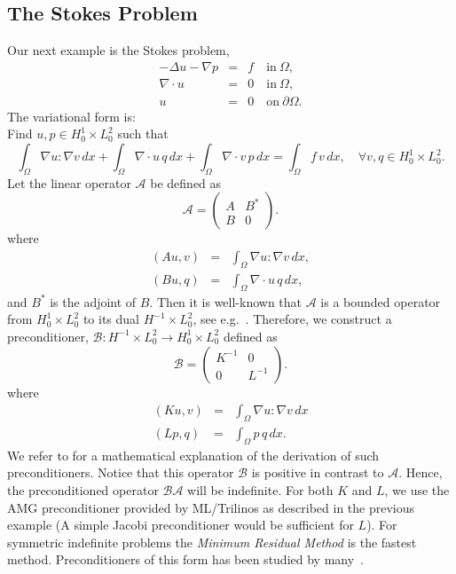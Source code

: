 \subsection{The Stokes Problem}
Our next example is the Stokes problem, 
\begin{eqnarray}
-\Delta u - \nabla p &=& f \quad \mbox{in} \ \Omega, \\ 
\nabla \cdot u &=& 0 \quad \mbox{in} \  \Omega, \\
             u &=& 0   \quad \mbox{on} \  \partial \Omega.  
\end{eqnarray}
The variational form is: \\ 
Find $u,p \in H^1_0 \times L_0^2$ such that  
\[
\int_\Omega \nabla u : \nabla v \,  dx + 
\int_\Omega \nabla \cdot u \, q \,  dx +  
\int_\Omega \nabla \cdot v \, p \,  dx = \int_\Omega f\, v\, dx   , \quad \forall v,q \in H^1_0 \times L_0^2.
\]
Let the linear operator $\mathcal{A}$ be defined as
\[
\mathcal{A}  =
\begin{pmatrix} A & B^* \\ B & 0 \end{pmatrix}.
\]
where 
\begin{eqnarray}
(A u, v) &=& \int_\Omega \nabla u : \nabla v \,  dx, \\  
(B u, q) &=& \int_\Omega \nabla \cdot u \, q \,  dx,    
\end{eqnarray}
and $B^*$ is the adjoint of $B$.  
Then it is well-known that $\mathcal{A}$ is a bounded operator from
$H^1_0 \times L_0^2$ to its dual $H^{-1} \times L_0^2$, see e.g.~\cite{Brezzi,BrezziFortin}. Therefore, we 
construct a preconditioner, 
$\mathcal{B}: H^{-1} \times L_0^2 \rightarrow H^1_0 \times L_0^2$
defined as 
\[
\mathcal{B} 
= 
\begin{pmatrix} K^{-1} & 0 \\ 0 & L^{-1} \end{pmatrix}.
\]
where 
\begin{eqnarray}
(K u, v) &=& \int_\Omega \nabla u: \nabla v \, dx \\ 
(L p, q) &=& \int_\Omega p \, q \, dx .   
\end{eqnarray}
We refer to \cite{M-W-09} for a mathematical explanation of the derivation 
of such preconditioners. 
Notice that this operator $\mathcal{B}$ is  positive in contrast to $\mathcal{A}$. Hence, 
the preconditioned operator $\mathcal{B} \mathcal{A}$ will be indefinite. For both 
$K$ and $L$, we use the AMG preconditioner provided by ML/Trilinos as
described in the previous example (A simple Jacobi preconditioner
would be sufficient for $L$).
For symmetric  indefinite problems the \emph{Minimum Residual Method} is
the fastest method. Preconditioners of this form has been studied by
many~\cite{E-S-W-text,R-W-92,S-W-93,S-W-94}. 

